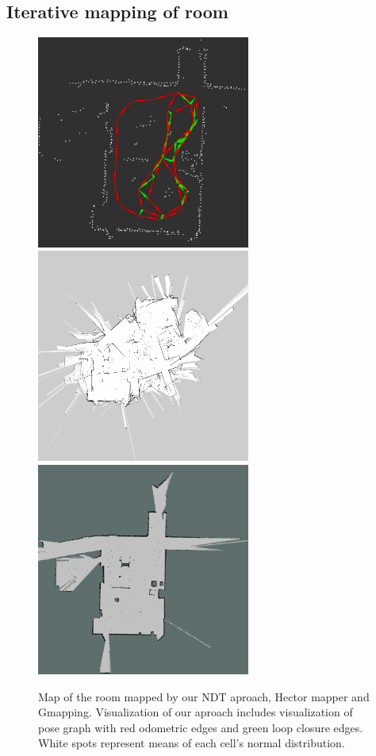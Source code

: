 \subsection{Iterative mapping of room}
\begin{figure}
	\centering
	\includegraphics[width=70mm]{../img/room_ndt.png}
		\vspace{0.1cm}
	\includegraphics[width=70mm]{../img/room_hector.png}
	\includegraphics[width=70mm]{../img/room_gmapping.png}
	
	\caption{Map of the room mapped by our NDT aproach, Hector mapper and Gmapping. Visualization of our aproach includes visualization of pose graph with red odometric edges and green loop closure edges. White spots represent means of each cell's  normal distribution.}\label{fig:room_res}
\end{figure}
